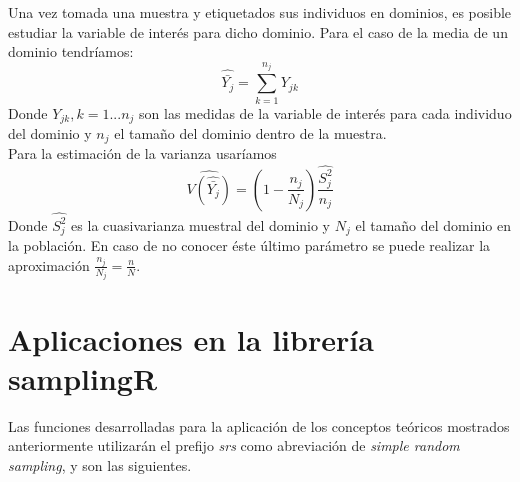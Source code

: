 Una vez tomada una muestra y etiquetados sus individuos en dominios, es posible estudiar la variable de interés para dicho dominio. Para el caso de la media de un dominio tendríamos:
\begin{equation}
    \hat{\bar{Y_j}} = \sum_{k=1}^{n_j}Y_{jk}
\end{equation}
Donde $Y_{jk}, k=1...n_j$ son las medidas de la variable de interés para cada individuo del dominio y $n_j$ el tamaño del dominio dentro de la muestra.\\

Para la estimación de la varianza usaríamos 
\begin{equation}
    \widehat{V(\hat{\bar{Y_j}})} = (1-\frac{n_j}{N_j})\frac{\hat{S_j^2}}{n_j}
\end{equation}
Donde $\hat{S_j^2}$ es la cuasivarianza muestral del dominio y $N_j$ el tamaño del dominio en la población. En caso de no conocer éste último parámetro se puede realizar la aproximación $\frac{n_j}{N_j} = \frac{n}{N}$. \\

\section{Aplicaciones en la librería samplingR}

Las funciones desarrolladas para la aplicación de los conceptos teóricos mostrados anteriormente utilizarán el prefijo \textit{srs} como abreviación de \textit{simple random sampling}, y son las siguientes.

